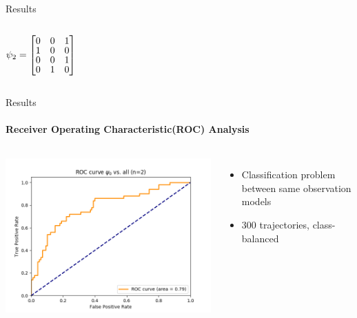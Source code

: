 \documentclass[
	english,%
	aspectratio=169,%
	color={accentcolor=3b},
	logo=true,%
	colorframetitle=false,%
	]{tudabeamer}
\begin{document}
\begin{frame}{Results}
\begin{columns}[onlytextwidth,c]
\begin{itemize}
		\vspace{+6pt}
		$\psi_{2} = 
		\begin{bmatrix} \vspace{-2pt}
		0 & 0 & 1 \\  \vspace{-2pt}
		1 & 0 & 0 \\  \vspace{-2pt}
		0 & 0 & 1 \\  \vspace{-1pt}
		0 & 1 & 0  
		\end{bmatrix}$
	\end{itemize}
\end{columns}
\end{frame}


\begin{frame}{Results}
\framesubtitle{Receiver Operating Characteristic(ROC) Analysis}
\begin{columns}[onlytextwidth,c]
	\centering
	\includegraphics[width=\linewidth]{figures/AUROC_100samples_class0_llh_n2}
	\begin{itemize}
		\item Classification problem between same observation models
		\item 300 trajectories, class-balanced
	\end{itemize}
\end{columns}
\end{frame}
\end{document}
